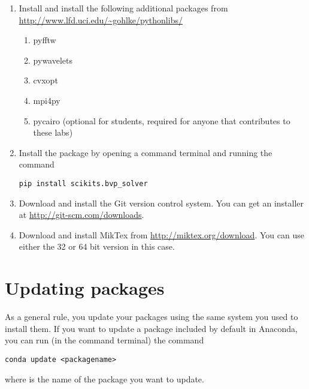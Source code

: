 \begin{enumerate}
\begin{lstlisting}
[build_ext]
compiler=mingw32
\end{lstlisting}

\item Install and install the following additional packages from \url{http://www.lfd.uci.edu/~gohlke/pythonlibs/}
\begin{enumerate}
	\item pyfftw
	\item pywavelets
	\item cvxopt
	\item mpi4py
	\item pycairo (optional for students, required for anyone that contributes to these labs)
\end{enumerate}

\item Install the  package by opening a command terminal and running the command
\begin{lstlisting}[style=ShellInput]
pip install scikits.bvp_solver
\end{lstlisting}

\item Download and install the Git version control system.
You can get an installer at \url{http://git-scm.com/downloads}.

\item Download and install MikTex from \url{http://miktex.org/download}.
You can use either the 32 or 64 bit version in this case.

\end{enumerate}

\section*{Updating packages}
As a general rule, you update your packages using the same system you used to install them.
If you want to update a package included by default in Anaconda, you can run (in the command terminal) the command
\begin{lstlisting}[style=ShellInput]
conda update <packagename>
\end{lstlisting}
where  is the name of the package you want to update.

